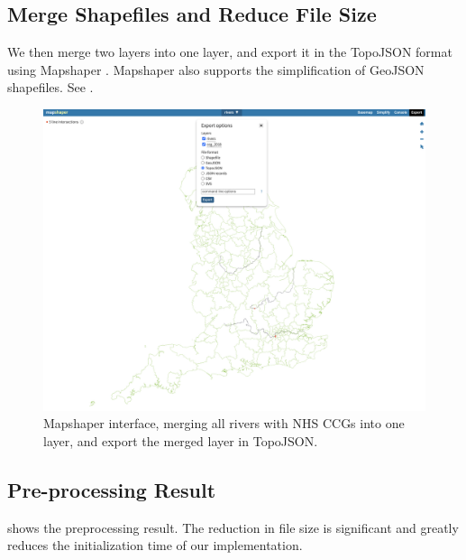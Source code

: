 \documentclass[Afour,sagev,times]{sagej}
\begin{document}
{}

\subsection{Merge Shapefiles and Reduce File Size}

We then merge two layers into one layer, and export it in the TopoJSON format using Mapshaper \cite{blochMapshaper}. Mapshaper also supports the simplification of GeoJSON shapefiles. See .

{
\begin{figure}[H]
    \centering
    \includegraphics[width=\columnwidth]{export_topojson.png}
    \caption{Mapshaper interface, merging all rivers with NHS CCGs into one layer, and export the merged layer in TopoJSON.}
    \label{fig:export_topojson}
\end{figure}
}

\subsection{Pre-processing Result}

 shows the preprocessing result. The reduction in file size is significant and greatly reduces the initialization time of our implementation.
\end{document}
